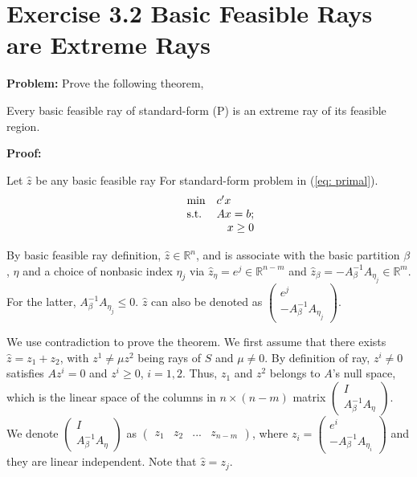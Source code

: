 \section{Exercise 3.2 Basic Feasible Rays are Extreme Rays}
\textbf{Problem: } Prove the following theorem,
\begin{thm}
Every basic feasible ray of standard-form (P) is an extreme ray of its feasible region.
\end{thm}

\textbf{Proof:}

Let $\widehat{z}$ be any basic feasible ray For standard-form problem in (\ref{eq: primal}). 
\begin{equation}
\label{eq: primal}
  \begin{array}{lrcll}
    \min
    & \multicolumn{4}{l}{c'x} \\
    \text{s.t.}
    & Ax=b;\\
    & x\geq0
  \end{array}
\end{equation}

By basic feasible ray definition, $\widehat{z}\in \mathbb{R}^{n}$, and is associate with the basic partition $\beta$, $\eta$ and a choice of nonbasic index $\eta_j$ via $\widehat{z}_{\eta}=e^j \in \mathbb{R}^{n-m}$ and $\widehat{z}_{\beta}=-A_{\beta}^{-1}A_{\eta_j} \in \mathbb{R}^{m}$. For the latter, $A_{\beta}^{-1}A_{\eta_j}\leq0$. $\widehat{z}$ can also be denoted as $\left( \begin{array}{c} e^j \\ -A_{\beta}^{-1}A_{\eta_j} \end{array}\right) $.

We use contradiction to prove the theorem. We first assume that there exists $\widehat{z}=z_1+z_2$, with $z^1\neq\mu z^2$ being rays of $S$ and $\mu\neq0$. By definition of ray, $z^i\neq0$ satisfies $Az^i=0$ and $z^i\geq0$, $i=1,2$. Thus, $z_1$ and $z^2$ belongs to $A$'s null space, which is the linear space of the columns in $n\times (n-m)$ matrix $\left( \begin{array}{c} I \\ A_{\beta}^{-1}A_{\eta} \end{array}\right) $. We denote $\left( \begin{array}{c} I \\ A_{\beta}^{-1}A_{\eta} \end{array}\right) $ as $\left( \begin{array}{cccc} z_1 & z_2 & ... & z_{n-m} \end{array}\right) $, where $z_i= \left( \begin{array}{c} e^i \\ -A_{\beta}^{-1}A_{\eta_i} \end{array}\right) $ and they are linear independent. Note that $\widehat{z}=z_j$.

